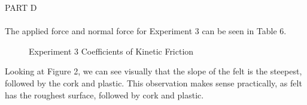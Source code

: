 \documentclass [12pt, letterpaper, twoside] {article}
\begin{document}
\noindent
PART D \\\\
The applied force and normal force for Experiment 3 can be seen in Table 6. 

\begin{figure}[h!]
  \centering
  \caption {Experiment 3 Coefficients of Kinetic Friction}
\end{figure}

\noindent
Looking at Figure 2, we can see visually that the slope of the felt is the steepest, followed by the cork and plastic. This observation makes sense practically, as felt has the roughest surface, followed by cork and plastic. \\\\
\end{document}
